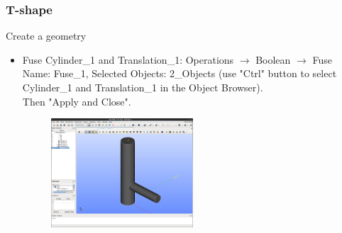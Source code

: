 \documentclass[10pt, hyperref={unicode=true,pdfusetitle, bookmarks=true,bookmarksnumbered=false,bookmarksopen=false, breaklinks=false,pdfborder={0 0 1},backref=true,colorlinks=true,linkcolor=darkblue,pageanchor}]{beamer}
\begin{document}
\begin{frame}
\frametitle{T-shape}
\begin{block}{Create a geometry}

\begin{itemize}
\item Fuse Cylinder\_1 and Translation\_1: Operations $\rightarrow$ Boolean $\rightarrow$ Fuse\\
Name: Fuse\_1, Selected Objects: 2\_Objects (use "Ctrl" button to select Cylinder\_1 and Translation\_1 in the Object Browser). \\
Then "Apply and Close".

\begin{figure}
\includegraphics[width=0.5\textwidth]{PICTURES/salome14.jpg}
\end{figure}

\end{itemize}

\end{block}
\end{frame}
\end{document}
